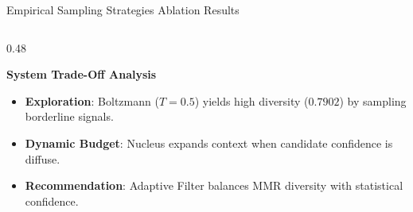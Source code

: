 \documentclass[10pt,aspectratio=169]{beamer}
\begin{document}
\begin{frame}{Empirical Sampling Strategies Ablation Results}
\begin{columns}[onlytextwidth,T]
        \begin{column}{0.48\textwidth}
            \begin{exampleblock}{\textbf{System Trade-Off Analysis}}
                \scriptsize
                \begin{itemize}\setlength\itemsep{1.5pt}
                    \item \textbf{Exploration}: Boltzmann ($T=0.5$) yields high diversity ($0.7902$) by sampling borderline signals.
                    \item \textbf{Dynamic Budget}: Nucleus expands context when candidate confidence is diffuse.
                    \item \textbf{Recommendation}: Adaptive Filter balances MMR diversity with statistical confidence.
                \end{itemize}
            \end{exampleblock}
        \end{column}
    \end{columns}
\end{frame}
\end{document}
